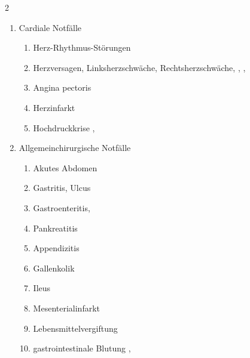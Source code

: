 \begin{WidePar}
\begin{multicols}{2}
\begin{enumerate}
\begin{enumerate}
      \item      Lungenödem \dotfill {}
      \item      Lungenembolie \dotfill {}
      \item      Lungenentzündung \dotfill {}
    \end{enumerate}
    \item Cardiale Notfälle
    \begin{enumerate}
      \item
      Herz-Rhythmus-Störungen \dotfill {}
      \item Herzversagen,      Linksherzschwäche,      Rechtsherzschwäche, \dotfill {},       ,      
      \item Angina pectoris \dotfill {}
      \item Herzinfarkt \dotfill  {}
      \item Hochdruckkrise \dotfill  {}, 
    \end{enumerate}
    \item Allgemeinchirurgische Notfälle
    \begin{enumerate}
      \item Akutes Abdomen \dotfill {}
      \item
      Gastritis, Ulcus \dotfill {}
      \item  Gastroenteritis, \dotfill {}
      \item  Pankreatitis \dotfill {}
      \item   Appendizitis \dotfill {}
      \item   Gallenkolik \dotfill {}
      \item   Ileus \dotfill {}
      \item    Mesenterialinfarkt \dotfill {}
      \item  Lebensmittelvergiftung \dotfill {}
      \item gastrointestinale Blutung \dotfill   {},     

\end{enumerate}
\end{enumerate}
\end{multicols}
\end{WidePar}
